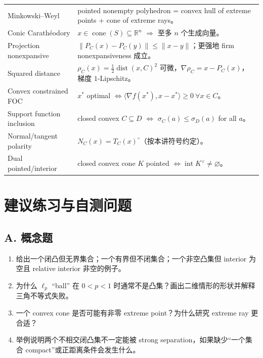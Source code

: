 \documentclass[11pt,a4paper,openany]{ctexrep}
\theoremstyle{definition}
\newcommand{\R}{\mathbb{R}}
\newcommand{\cone}{\operatorname{cone}}
\newcommand{\dist}{\operatorname{dist}}
\begin{document}
\begin{longtable}{p{}p{}}
Minkowski--Weyl & pointed nonempty polyhedron = convex hull of extreme points + cone of extreme rays。\\
Conic Carath\'eodory & $x\in\cone(S)\subseteq\R^n$ $\Rightarrow$ 至多 $n$ 个生成向量。\\
Projection nonexpansive & $\|P_C(x)-P_C(y)\|\le\|x-y\|$；更强地 firm nonexpansiveness 成立。\\
Squared distance & $\rho_C(x)=\tfrac12\dist(x,C)^2$ 可微，$\nabla\rho_C=x-P_C(x)$，梯度 $1$-Lipschitz。\\
Convex constrained FOC & $x^*$ optimal $\Leftrightarrow \langle\nabla f(x^*),x-x^*\rangle\ge0\ \forall x\in C$。\\
Support function inclusion & closed convex $C\subseteq D$ $\Leftrightarrow$ $\sigma_C(a)\le\sigma_D(a)$ for all $a$。\\
Normal/tangent polarity & $N_C(x)=T_C(x)^\circ$（按本讲符号约定）。\\
Dual pointed/interior & closed convex cone $K$ pointed $\Leftrightarrow \operatorname{int}K^\vee\ne\varnothing$。\\
\bottomrule
\end{longtable}

\chapter{建议练习与自测问题}

\section*{A. 概念题}
\begin{enumerate}[leftmargin=2.3em]
  \item 给出一个闭凸但无界集合；一个有界但不闭集合；一个非空凸集但 interior 为空且 relative interior 非空的例子。
  \item 为什么 $\ell_p$ ``ball'' 在 $0<p<1$ 时通常不是凸集？画出二维情形的形状并解释三角不等式失败。
  \item 一个 convex cone 是否可能有非零 extreme point？为什么研究 extreme ray 更合适？
  \item 举例说明两个不相交闭凸集不一定能被 strong separation，如果缺少“一个集合 compact”或正距离条件会发生什么。
\end{enumerate}
\end{document}
